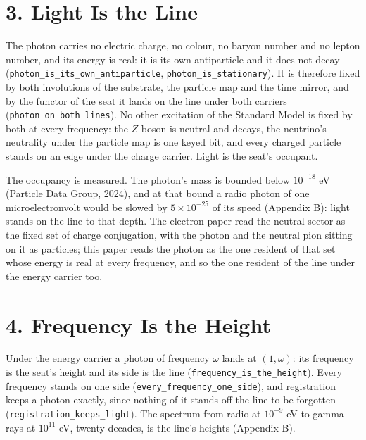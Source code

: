 \documentclass[10pt]{article}
\begin{document}
\endgroup

\hypertarget{light-is-the-line}{%
\section{3. Light Is the Line}\label{light-is-the-line}}

The photon carries no electric charge, no colour, no baryon number and
no lepton number, and its energy is real: it is its own antiparticle and
it does not decay (\texttt{photon\_is\_its\_own\_antiparticle},
\texttt{photon\_is\_stationary}). It is therefore fixed by both
involutions of the substrate, the particle map and the time mirror, and
by the functor of the seat it lands on the line under both carriers
(\texttt{photon\_on\_both\_lines}). No other excitation of the Standard
Model is fixed by both at every frequency: the \(Z\) boson is neutral
and decays, the neutrino's neutrality under the particle map is one
keyed bit, and every charged particle stands on an edge under the charge
carrier. Light is the seat's occupant.

The occupancy is measured. The photon's mass is bounded below
\(10^{-18}\) eV (Particle Data Group, 2024), and at that bound a radio
photon of one microelectronvolt would be slowed by \(5\times10^{-25}\)
of its speed (Appendix B): light stands on the line to that depth. The
electron paper read the neutral sector as the fixed set of charge
conjugation, with the photon and the neutral pion sitting on it as
particles; this paper reads the photon as the one resident of that set
whose energy is real at every frequency, and so the one resident of the
line under the energy carrier too.

\hypertarget{frequency-is-the-height}{%
\section{4. Frequency Is the Height}\label{frequency-is-the-height}}

Under the energy carrier a photon of frequency \(\omega\) lands at
\((1,\omega)\): its frequency is the seat's height and its side is the
line (\texttt{frequency\_is\_the\_height}). Every frequency stands on
one side (\texttt{every\_frequency\_one\_side}), and registration keeps
a photon exactly, since nothing of it stands off the line to be
forgotten (\texttt{registration\_keeps\_light}). The spectrum from radio
at \(10^{-9}\) eV to gamma rays at \(10^{11}\) eV, twenty decades, is
the line's heights (Appendix B).
\end{document}
